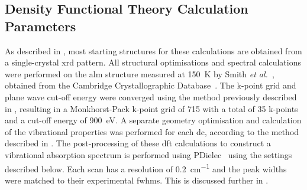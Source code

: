\subsection{Density Functional Theory Calculation Parameters}
As described in , most starting structures for these calculations are obtained from a single\nobreakdash-crystal \acrshort{xrd} pattern. All structural optimisations and spectral calculations were performed on the \acrshort{alm} structure measured at \SI{150}{K} by Smith \textit{et al.}~\cite{Smith2005}, obtained from the Cambridge Crystallographic Database~\cite{Groom2016}. The k\nobreakdash-point grid and plane wave cut-off energy were converged using the method previously described in , resulting in a Monkhorst\nobreakdash-Pack k\nobreakdash-point grid of 715 with a total of 35 k\nobreakdash-points and a cut\nobreakdash-off energy of \SI{900}{eV}. A separate geometry optimisation and calculation of the vibrational properties was performed for each \acrshort{dc}, according to the method described in . The post\nobreakdash-processing of these \acrshort{dft} calculations to construct a vibrational absorption spectrum is performed using PDielec~\cite{Kendrick2016} using the settings described below. Each scan has a resolution of \SI{0.2}{cm^{-1}} and the peak widths were matched to their experimental \acrshort{fwhm}s. This is discussed further in . 


